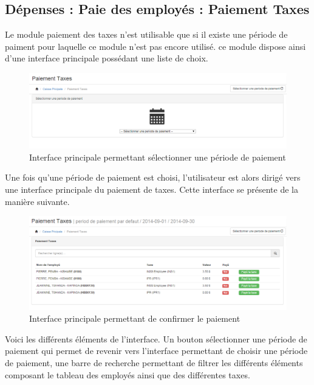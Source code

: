 \documentclass[12pt,a4paper]{report}
\begin{document}
\subsection{Dépenses : Paie des employés : Paiement Taxes}
Le module paiement des taxes n'est utilisable que si il existe une période de paiment pour laquelle ce module n'est pas encore utilisé. ce module dispose ainsi d'une interface principale possédant une liste de choix.

\begin{figure}[h]
\begin{center}
\includegraphics[width=14cm]{pic/PaieTaxes.png}
\end{center}
\caption{Interface principale permettant sélectionner une période de paiement}
\label{Interface principale permettant sélectionner une période de paiement}
\end{figure}

Une fois qu'une période de paiement est choisi, l'utilisateur est alors dirigé vers une interface principale du paiement de taxes. Cette interface se présente de la manière suivante.

\begin{figure}[h]
\begin{center}
\includegraphics[width=14cm]{pic/PaieTaxes2.png}
\end{center}
\caption{Interface principale permettant de confirmer le paiement}
\label{Interface principale permettant de confirmer le paiement}
\end{figure}


Voici les différents éléments de l'interface. Un bouton sélectionner une période de paiement qui permet de revenir vers l'interface permettant de choisir une période de paiement, une barre de recherche permettant de filtrer les différents éléments composant le tableau des employés ainsi que des différentes taxes.
\end{document}
